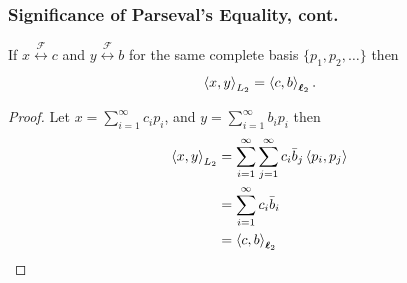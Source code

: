 \documentclass{beamer}
\begin{document}
\begin{frame}\frametitle{Significance of Parseval's Equality, cont.}
	\begin{lemma}
	If $x \overset{\mathcal{F}}{\longleftrightarrow} c$ and $y \overset{\mathcal{F}}{\longleftrightarrow}
	b$ for the same complete basis $\{p_1,p_2,\ldots\}$ then
	\[ 
	\left<x,y \right>_{L_2} = \left<c,b \right>_{\boldsymbol{\ell}_2}.
	\]		
	\end{lemma}
	\begin{proof}
	Let $x = \sum_{i=1}^{\infty} c_ip_i$, and  $y = \sum_{i=1}^{\infty}b_ip_i$
	then
	\begin{align*}
	\left<x,y \right>_{L_2} &=
	\sum_{i=1}^{\infty}\sum_{j=1}^{\infty}c_i\bar{b}_j\left<p_i,p_j \right>\\
	&= \sum_{i=1}^{\infty} c_i\bar{b}_i\\
	&= \left<c,b \right>_{\boldsymbol{\ell}_2}
	\end{align*}		
	\end{proof}
\end{frame}
\end{document}
